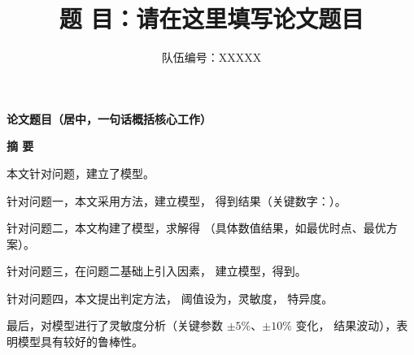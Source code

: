 \documentclass[12pt]{article}
\title{\textbf{题 目：请在这里填写论文题目}}
\author{队伍编号：XXXXX}
\date{}
\begin{document}

\begin{center}
{\LARGE\bfseries 论文题目（居中，一句话概括核心工作）\par}
\vspace{0.6cm}
{\LARGE\bfseries 摘 \quad 要}
\end{center}

本文针对\underline{\hspace{4cm}}问题，建立了\underline{\hspace{3cm}}模型。

针对问题一，本文采用\underline{\hspace{3cm}}方法，建立\underline{\hspace{3cm}}模型，
得到\underline{\hspace{3cm}}结果（关键数字：\underline{\hspace{3cm}}）。

针对问题二，本文构建了\underline{\hspace{3cm}}模型，求解得\underline{\hspace{3cm}}
（具体数值结果，如最优时点、最优方案）。

针对问题三，在问题二基础上引入\underline{\hspace{3cm}}因素，
建立\underline{\hspace{3cm}}模型，得到\underline{\hspace{3cm}}。

针对问题四，本文提出\underline{\hspace{3cm}}判定方法，
阈值设为\underline{\hspace{3cm}}，灵敏度\underline{\hspace{3cm}}，
特异度\underline{\hspace{3cm}}。

最后，对模型进行了灵敏度分析（关键参数 $\pm 5\%$、$\pm 10\%$ 变化，
结果波动\underline{\hspace{2cm}}），表明模型具有较好的鲁棒性。
\end{document}
